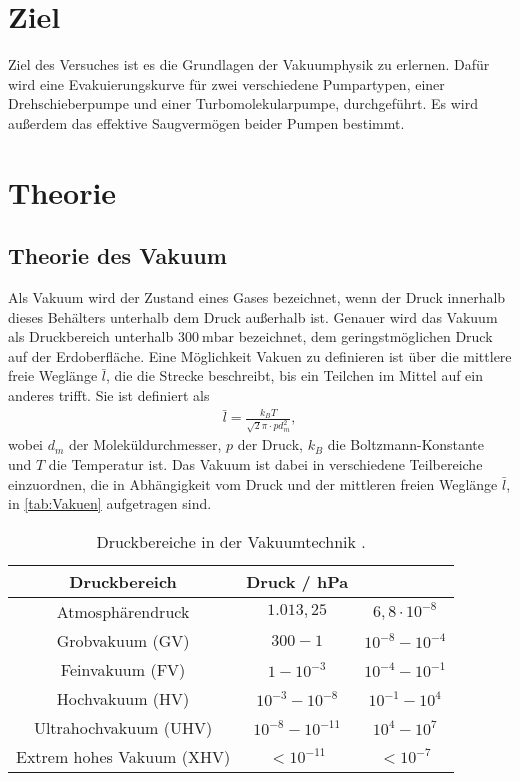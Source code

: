 \section{Ziel}
\label{sec:Ziel}

Ziel des Versuches ist es die Grundlagen der Vakuumphysik zu erlernen. Dafür wird eine Evakuierungskurve für zwei verschiedene Pumpartypen, einer Drehschieberpumpe
und einer Turbomolekularpumpe, durchgeführt. Es wird außerdem das effektive Saugvermögen beider Pumpen bestimmt.

\section{Theorie}
\label{sec:Theorie}

\subsection{Theorie des Vakuum}
\label{subsec:vakuum}

Als Vakuum wird der Zustand eines Gases bezeichnet, wenn der Druck innerhalb dieses Behälters unterhalb dem Druck außerhalb ist. Genauer wird das Vakuum als Druckbereich unterhalb
$\SI{300}{\milli\bar}$ bezeichnet, dem geringstmöglichen Druck auf der Erdoberfläche. Eine Möglichkeit Vakuen zu definieren ist über die mittlere freie Weglänge $\bar l$, die die
Strecke beschreibt, bis ein Teilchen im Mittel auf ein anderes trifft. Sie ist definiert als
\begin{align}
    \bar l = \frac{k_B T}{\sqrt 2 \pi\cdot p d_m^2},
\end{align}
wobei $d_m$ der Moleküldurchmesser, $p$ der Druck, $k_B$ die Boltzmann-Konstante und $T$ die Temperatur ist.
Das Vakuum ist dabei in verschiedene Teilbereiche einzuordnen, die in Abhängigkeit vom Druck
und der mittleren freien Weglänge $\bar l$, in \autoref{tab:Vakuen} aufgetragen sind.

\begin{table}[H]
    \centering
    \caption{Druckbereiche in der Vakuumtechnik \cite{EinfuehrungVakuum}.}
    \label{tab:Vakuen}
    \begin{tabular}{c c c}
        \toprule
        Druckbereich & Druck / hPa &  \\
        \midrule
        Atmosphärendruck    & $1.013,25$    & $6,8\cdot10^{-8}$   \\
        Grobvakuum (GV)     & $300 - 1$     & $10^{-8}-10^{-4}$   \\
        Feinvakuum (FV)     & $1 - 10^{-3}$ & $10^{-4} - 10^{-1}$ \\
        Hochvakuum (HV)     & $10^{-3} - 10^{-8}$ & $10^{-1} - 10^{4}$ \\
        Ultrahochvakuum (UHV) & $10^{-8} - 10^{-11}$ & $10^{4} - 10^{7}$ \\
        Extrem hohes Vakuum (XHV) & $<10^{-11}$ & $<10^{-7}$ \\
        \bottomrule
    \end{tabular}
\end{table}

